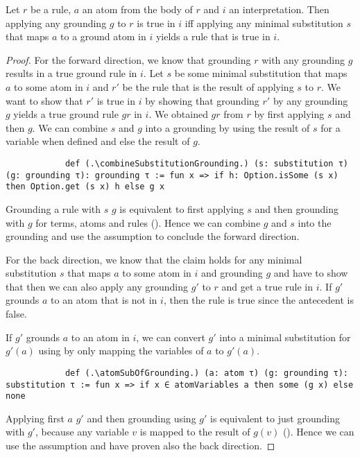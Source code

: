     \begin{lemma}[\replaceGroundingWithSubstitutionAndGrounding]
        Let $r$ be a rule, $a$ an atom from the body of $r$ and $i$ an interpretation. Then applying any grounding $g$ to $r$ is true in $i$ iff applying any minimal substitution $s$ that maps $a$ to a ground atom in $i$ yields a rule that is true in $i$. 
    \end{lemma}
    \begin{proof}
        For the forward direction, we know that grounding $r$ with any grounding $g$ results in a true ground rule in $i$. Let $s$ be some minimal substitution that maps $a$ to some atom in $i$ and $r'$ be the rule that is the result of applying $s$ to $r$. We want to show that $r'$ is true in $i$ by showing that grounding $r'$ by any grounding $g$ yields a true ground rule $gr$ in $i$. We obtained $gr$ from $r$ by first applying $s$ and then $g$. We can combine $s$ and $g$ into a grounding by using the result of $s$ for a variable when defined and else the result of $g$.

        \begin{lstlisting}
            def (.\combineSubstitutionGrounding.) (s: substitution τ) (g: grounding τ): grounding τ := fun x => if h: Option.isSome (s x) then Option.get (s x) h else g x
        \end{lstlisting}

        Grounding a rule with \combineSubstitutionGrounding $s$ $g$ is equivalent to first applying $s$ and then grounding with $g$ for terms, atoms and rules (\combineSubstitutionGroundingEquivRule). Hence we can combine $g$ and $s$ into the grounding \combineSubstitutionGrounding and use the assumption to conclude the forward direction.

        For the back direction, we know that the claim holds for any minimal substitution $s$ that maps $a$ to some atom in $i$ and grounding $g$ and have to show that then we can also apply any grounding $g'$ to $r$ and get a true rule in $i$. If $g'$ grounds $a$ to an atom that is not in $i$, then the rule is true since the antecedent is false.

        If $g'$ grounds $a$ to an atom in $i$, we can convert $g'$ into a minimal substitution for $g'(a)$ using \atomSubOfGrounding by only mapping the variables of $a$ to $g'(a)$.

        \begin{lstlisting}
            def (.\atomSubOfGrounding.) (a: atom τ) (g: grounding τ): substitution τ := fun x => if x ∈ atomVariables a then some (g x) else none
        \end{lstlisting}

        Applying first \atomSubOfGrounding $a$ $g'$ and then grounding using $g'$ is equivalent to just grounding with $g'$, because any variable $v$ is mapped to the result of $g(v)$
        (\atomSubOfGroundingGroundingEqGroundingOnRule). Hence we can use the assumption and have proven also the back direction.
    \end{proof}

